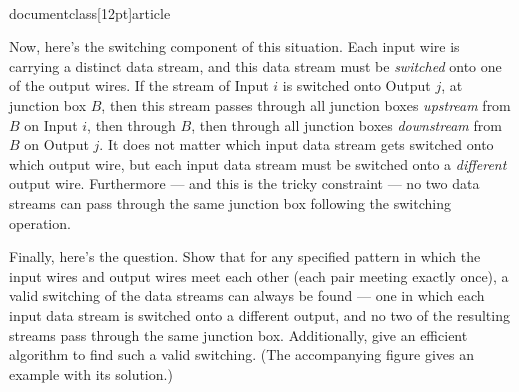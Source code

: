 \\documentclass[12pt]{article}
\begin{document}
\begin{enumerate}
Now, here's the switching component of this situation.
Each input wire is carrying a distinct data stream,
and this data stream must be {\em switched} onto one of the output wires.
If the stream of Input $i$ is switched onto Output $j$,
at junction box $B$, then this stream passes through all junction
boxes {\em upstream} from $B$ on Input $i$, then through $B$, then through
all junction boxes {\em downstream} from $B$ on Output $j$.
It does not matter which input data stream gets switched
onto which output wire, but each input data stream must
be switched onto a {\em different} output wire.
Furthermore --- and this is the tricky constraint ---
no two data streams can pass through the same junction box
following the switching operation.


Finally, here's the question.
Show that for any
specified pattern in which the input wires and output wires meet each other
(each pair meeting exactly once),
a valid switching of the data streams can always be found ---
one in which each input data stream is switched onto a different output,
and no two of the resulting streams pass through the same junction box.
Additionally, give an efficient algorithm to find such a valid switching.
(The accompanying figure gives an example with its solution.)

\begin{figure}[h]
\begin{center}


\end{center}
\end{figure}
\end{enumerate}
\end{document}
